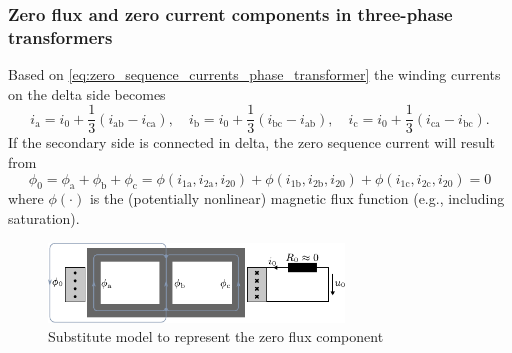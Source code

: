 \begin{frame}
	\frametitle{Zero flux and zero current components in three-phase transformers}
	Based on \eqref{eq:zero_sequence_currents_phase_transformer} the winding currents on the delta side becomes
	\begin{equation}		
			i_\mathrm{a} = i_0 + \frac{1}{3}\left(i_\mathrm{ab}-i_\mathrm{ca}\right), \quad i_\mathrm{b} = i_0 + \frac{1}{3}\left(i_\mathrm{bc}-i_\mathrm{ab}\right), \quad i_\mathrm{c} = i_0 + \frac{1}{3}\left(i_\mathrm{ca}-i_\mathrm{bc}\right).
	\end{equation}
	If the secondary side is connected in delta, the zero sequence current will result from
	\begin{equation}
		\phi_0 = \phi_\mathrm{a} + \phi_\mathrm{b} + \phi_\mathrm{c}  = 
		\phi(i_{1\mathrm{a}}, i_{2\mathrm{a}}, i_{20}) + \phi(i_{1\mathrm{b}}, i_{2\mathrm{b}}, i_{20}) +\phi(i_{1\mathrm{c}}, i_{2\mathrm{c}}, i_{20}) =0
	\end{equation}
	where $\phi(\cdot)$ is the (potentially nonlinear) magnetic flux function (e.g., including saturation).
	\begin{figure}
		\includegraphics[width=0.7\textwidth]{fig/lec04/Zero_flux_model.pdf}
		\caption{Substitute model to represent the zero flux component}
		\label{fig:Zero_flux_model}
	\end{figure}
\end{frame}


